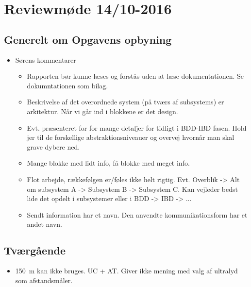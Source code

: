 
\chapter{Reviewmøde 14/10-2016}

\section{Generelt om Opgavens opbyning}
\begin{itemize}
	\item Sørens kommentarer
	\begin{itemize}
		\item Rapporten bør kunne læses og forstås uden at læse dokumentationen. Se dokumntationen som bilag.
		\item Beskrivelse af det overordnede system (på tværs af subsystems) er arkitektur. Når vi går ind i blokkene er det design.
		\item Evt. præsenteret for for mange detaljer for tidligt i BDD-IBD fasen. Hold jer til de forskellige abstraktionsniveauer og overvej hvornår man skal grave dybere ned.
		\item Mange blokke med lidt info, få blokke med meget info.
		\item Flot arbejde, rækkefølgen er/føles ikke helt rigtig. Evt. Overblik -> Alt om subsystem A -> Subsystem B -> Subsystem C. Kan vejleder bedst lide det opdelt i subsystemer eller i BDD -> IBD -> ...
		\item Sendt information har et navn. Den anvendte kommunikationsform har et andet navn.
	\end{itemize}
\end{itemize}

\section{Tværgående}
\begin{itemize}
	\item \SI{150}{\metre} kan ikke bruges. UC + AT. Giver ikke mening med valg af ultralyd som afstandsmåler.
\end{itemize}


